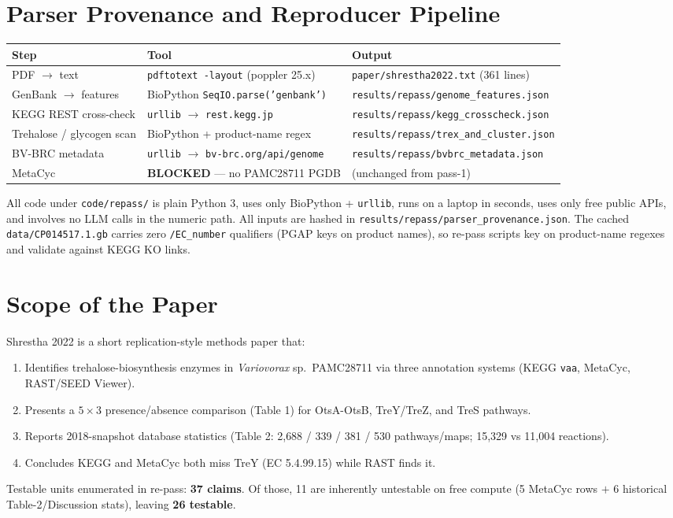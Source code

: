 \documentclass[11pt,letterpaper]{article}
\begin{document}
\section{Parser Provenance and Reproducer Pipeline}
\begin{tabularx}{\linewidth}{@{}l l X@{}}
\toprule
Step & Tool & Output \\
\midrule
PDF $\to$ text        & \texttt{pdftotext -layout} (poppler 25.x) & \texttt{paper/shrestha2022.txt} (361 lines) \\
GenBank $\to$ features & BioPython \texttt{SeqIO.parse('genbank')} & \texttt{results/repass/genome\_features.json} \\
KEGG REST cross-check  & \texttt{urllib} $\to$ \texttt{rest.kegg.jp} & \texttt{results/repass/kegg\_crosscheck.json} \\
Trehalose / glycogen scan & BioPython + product-name regex & \texttt{results/repass/trex\_and\_cluster.json} \\
BV-BRC metadata        & \texttt{urllib} $\to$ \texttt{bv-brc.org/api/genome} & \texttt{results/repass/bvbrc\_metadata.json} \\
MetaCyc                & \textbf{BLOCKED} --- no PAMC28711 PGDB & (unchanged from pass-1) \\
\bottomrule
\end{tabularx}

\medskip
All code under \texttt{code/repass/} is plain Python 3, uses only BioPython + \texttt{urllib}, runs
on a laptop in seconds, uses only free public APIs, and involves no LLM calls in the numeric path.
All inputs are hashed in \texttt{results/repass/parser\_provenance.json}. The cached
\texttt{data/CP014517.1.gb} carries zero \texttt{/EC\_number} qualifiers (PGAP keys on product
names), so re-pass scripts key on product-name regexes and validate against KEGG KO links.

\section{Scope of the Paper}
Shrestha 2022 is a short replication-style methods paper that:
\begin{enumerate}[leftmargin=1.5em,itemsep=1pt]
  \item Identifies trehalose-biosynthesis enzymes in \textit{Variovorax} sp.\ PAMC28711 via three annotation
        systems (KEGG \texttt{vaa}, MetaCyc, RAST/SEED Viewer).
  \item Presents a $5\times 3$ presence/absence comparison (Table 1) for OtsA-OtsB, TreY/TreZ, and TreS pathways.
  \item Reports 2018-snapshot database statistics (Table 2: 2{,}688 / 339 / 381 / 530 pathways/maps; 15{,}329 vs 11{,}004 reactions).
  \item Concludes KEGG and MetaCyc both miss TreY (EC 5.4.99.15) while RAST finds it.
\end{enumerate}
Testable units enumerated in re-pass: \textbf{37 claims}. Of those, 11 are inherently untestable on free compute
(5 MetaCyc rows $+$ 6 historical Table-2/Discussion stats), leaving \textbf{26 testable}.
\end{document}

